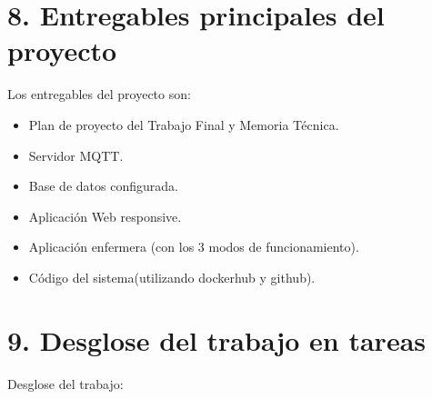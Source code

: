 \documentclass[
11pt, %
]{charter}
\begin{document}
\section{8. Entregables principales del proyecto}
\label{sec:entregables}



Los entregables del proyecto son:

\begin{itemize}
	\item Plan de proyecto del Trabajo Final y Memoria Técnica.
	\item Servidor MQTT.
	\item Base de datos configurada.
	\item Aplicación Web responsive.
	\item Aplicación enfermera (con los 3 modos de funcionamiento).
	\item Código del sistema(utilizando dockerhub y github).
\end{itemize}



\section{9. Desglose del trabajo en tareas}
\label{sec:wbs}


Desglose del trabajo:
\end{document}
